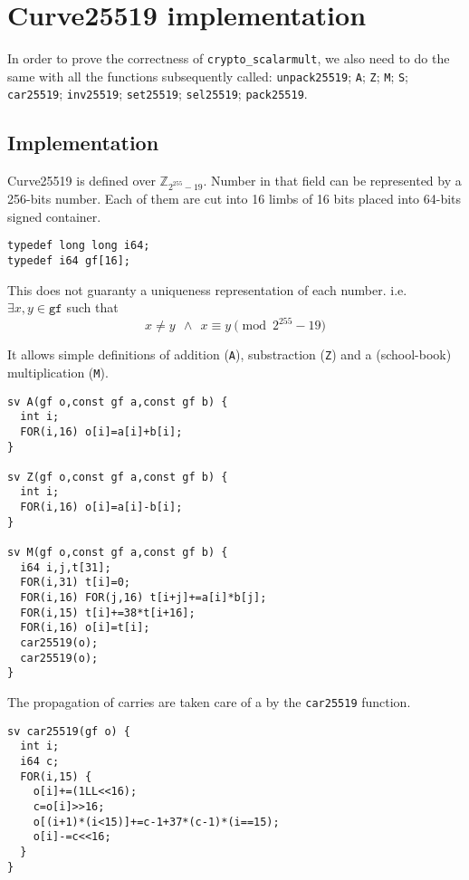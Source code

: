 \section{Curve25519 implementation}

In order to prove the correctness of \texttt{crypto\_scalarmult},
 we also need to do the same with all the functions subsequently called:
\texttt{unpack25519}; \texttt{A}; \texttt{Z}; \texttt{M}; \texttt{S};
\texttt{car25519}; \texttt{inv25519}; \texttt{set25519}; \texttt{sel25519};
\texttt{pack25519}.

\subsection{Implementation}

Curve25519 is defined over $\mathbb{Z}_{2^{255}-19}$. Number in that field can
be represented by a 256-bits number. Each of them are cut into 16 limbs of 16
bits placed into 64-bits signed container.
\begin{lstlisting}[language=Ctweetnacl]
typedef long long i64;
typedef i64 gf[16];
\end{lstlisting}
This does not guaranty a uniqueness representation of each number. i.e.\\
$\exists x,y \in \texttt{gf}$ such that
\vspace{-0.25cm}
  $$x \neq y\ \ \land\ \ x \equiv y \pmod{2^{255}-19}$$

It allows simple definitions of addition (\texttt{A}),
substraction (\texttt{Z}) and a (school-book) multiplication (\texttt{M}).
\begin{lstlisting}[language=Ctweetnacl]
sv A(gf o,const gf a,const gf b) {
  int i;
  FOR(i,16) o[i]=a[i]+b[i];
}

sv Z(gf o,const gf a,const gf b) {
  int i;
  FOR(i,16) o[i]=a[i]-b[i];
}

sv M(gf o,const gf a,const gf b) {
  i64 i,j,t[31];
  FOR(i,31) t[i]=0;
  FOR(i,16) FOR(j,16) t[i+j]+=a[i]*b[j];
  FOR(i,15) t[i]+=38*t[i+16];
  FOR(i,16) o[i]=t[i];
  car25519(o);
  car25519(o);
}
\end{lstlisting}

The propagation of carries are taken care of a by the \texttt{car25519} function.
\begin{lstlisting}[language=Ctweetnacl]
sv car25519(gf o) {
  int i;
  i64 c;
  FOR(i,15) {
    o[i]+=(1LL<<16);
    c=o[i]>>16;
    o[(i+1)*(i<15)]+=c-1+37*(c-1)*(i==15);
    o[i]-=c<<16;
  }
}
\end{lstlisting}

